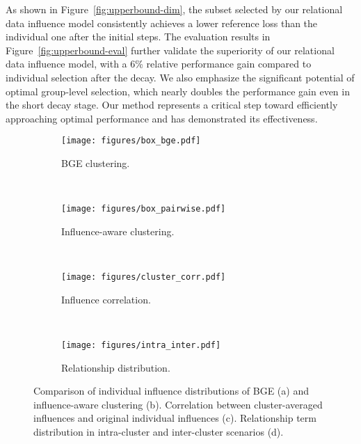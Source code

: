 As shown in Figure~\ref{fig:upperbound-dim}, the subset selected by our relational data influence model consistently achieves a lower reference loss than the individual one after the initial steps. The evaluation results in Figure~\ref{fig:upperbound-eval} further validate the superiority of our relational data influence model, with a 6\% relative performance gain compared to individual selection after the decay. We also emphasize the significant potential of optimal group-level selection, which nearly doubles the performance gain even in the short decay stage. Our method represents a critical step toward efficiently approaching optimal performance and has demonstrated its effectiveness. 


\begin{figure*}
    \centering
    \vspace{-0.3cm}
    \begin{subfigure}{0.22\textwidth}
    \centering
    \texttt{[image: figures/box\_bge.pdf]}
    \caption{BGE clustering.}
    \label{fig:box-bge}
    \end{subfigure}
    ~
    \begin{subfigure}{0.22\textwidth}
    \centering
    \texttt{[image: figures/box\_pairwise.pdf]}
    \caption{Influence-aware clustering.}
    \label{fig:box-pairwise}
    \end{subfigure}
    ~
    \begin{subfigure}{0.228\textwidth}
    \centering
    \texttt{[image: figures/cluster\_corr.pdf]}
    \caption{Influence correlation.}
    \label{fig:cluster-corr}
    \end{subfigure}
    ~
    \begin{subfigure}{0.243\textwidth}
    \centering
    \texttt{[image: figures/intra\_inter.pdf]}
    \caption{Relationship distribution.}
    \label{fig:intra-inter}
    \end{subfigure}
    \caption{Comparison of individual influence distributions of BGE (a) and influence-aware clustering (b). Correlation between cluster-averaged influences and original individual influences (c). Relationship term distribution in intra-cluster and inter-cluster scenarios (d).}
    \label{fig:clustering}
    \vspace{-0.5cm}
\end{figure*}

